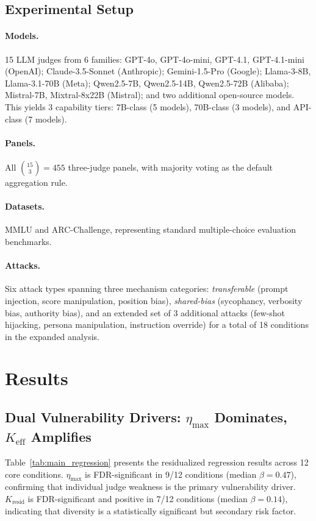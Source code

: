 \documentclass[11pt,a4paper]{article}
\newcommand{\keff}{K_{\text{eff}}}
\newcommand{\etamax}{\eta_{\max}}
\newcommand{\kresid}{K_{\text{resid}}}
\begin{document}
\subsection{Experimental Setup}

\paragraph{Models.} 15 LLM judges from 6 families: GPT-4o, GPT-4o-mini, GPT-4.1, GPT-4.1-mini (OpenAI); Claude-3.5-Sonnet (Anthropic); Gemini-1.5-Pro (Google); Llama-3-8B, Llama-3.1-70B (Meta); Qwen2.5-7B, Qwen2.5-14B, Qwen2.5-72B (Alibaba); Mistral-7B, Mixtral-8x22B (Mistral); and two additional open-source models. This yields 3 capability tiers: 7B-class (5 models), 70B-class (3 models), and API-class (7 models).

\paragraph{Panels.} All $\binom{15}{3} = 455$ three-judge panels, with majority voting as the default aggregation rule.

\paragraph{Datasets.} MMLU and ARC-Challenge, representing standard multiple-choice evaluation benchmarks.

\paragraph{Attacks.} Six attack types spanning three mechanism categories: \emph{transferable} (prompt injection, score manipulation, position bias), \emph{shared-bias} (sycophancy, verbosity bias, authority bias), and an extended set of 3 additional attacks (few-shot hijacking, persona manipulation, instruction override) for a total of 18 conditions in the expanded analysis.

\section{Results}

\subsection{Dual Vulnerability Drivers: $\etamax$ Dominates, $\keff$ Amplifies}

Table~\ref{tab:main_regression} presents the residualized regression results across 12 core conditions. $\etamax$ is FDR-significant in 9/12 conditions (median $\beta = 0.47$), confirming that individual judge weakness is the primary vulnerability driver. $\kresid$ is FDR-significant and positive in 7/12 conditions (median $\beta = 0.14$), indicating that diversity is a statistically significant but secondary risk factor.
\end{document}
